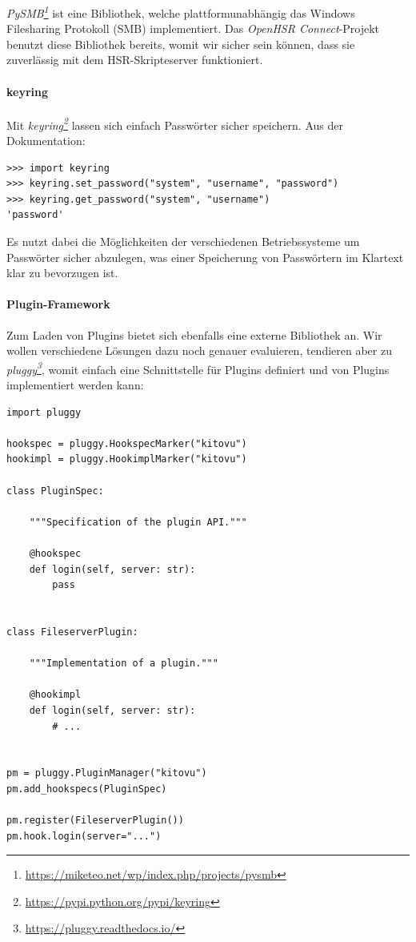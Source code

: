 \documentclass[a4paper]{article}
\newcommand{\tool}[2]{\emph{#1\footnote{\url{#2}}}}
\begin{document}
\tool{PySMB}{https://miketeo.net/wp/index.php/projects/pysmb} ist eine
Bibliothek, welche plattformunabhängig das Windows Filesharing Protokoll (SMB)
implementiert. Das \emph{OpenHSR Connect}-Projekt benutzt diese Bibliothek
bereits, womit wir sicher sein können, dass sie zuverlässig mit dem
HSR-Skripteserver funktioniert.

\paragraph{keyring}

Mit \tool{keyring}{https://pypi.python.org/pypi/keyring} lassen sich einfach
Passwörter sicher speichern. Aus der Dokumentation:

\begin{verbatim}
>>> import keyring
>>> keyring.set_password("system", "username", "password")
>>> keyring.get_password("system", "username")
'password'
\end{verbatim}

Es nutzt dabei die Möglichkeiten der verschiedenen Betriebssysteme um Passwörter
sicher abzulegen, was einer Speicherung von Passwörtern im Klartext klar zu
bevorzugen ist.

\paragraph{Plugin-Framework}

Zum Laden von Plugins bietet sich ebenfalls eine externe Bibliothek an. Wir
wollen verschiedene Lösungen dazu noch genauer evaluieren, tendieren aber zu
\tool{pluggy}{https://pluggy.readthedocs.io/}, womit einfach eine Schnittstelle
für Plugins definiert und von Plugins implementiert werden kann:

\begin{verbatim}
import pluggy

hookspec = pluggy.HookspecMarker("kitovu")
hookimpl = pluggy.HookimplMarker("kitovu")

class PluginSpec:

    """Specification of the plugin API."""

    @hookspec
    def login(self, server: str):
        pass


class FileserverPlugin:

    """Implementation of a plugin."""

    @hookimpl
    def login(self, server: str):
        # ...


pm = pluggy.PluginManager("kitovu")
pm.add_hookspecs(PluginSpec)

pm.register(FileserverPlugin())
pm.hook.login(server="...")
\end{verbatim}
\end{document}
